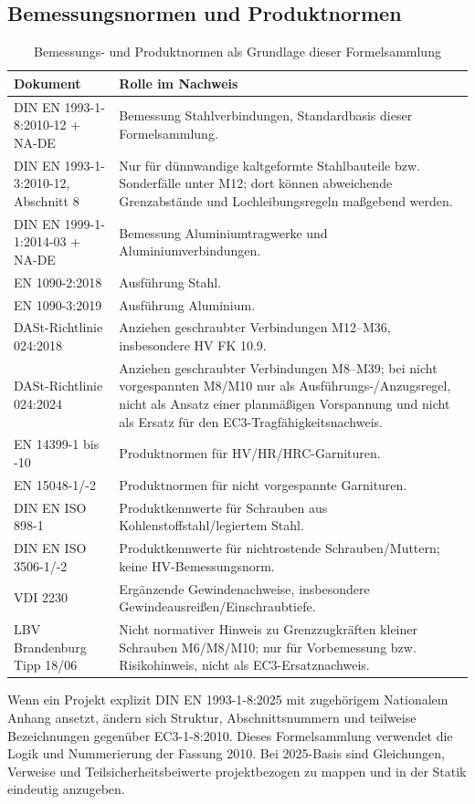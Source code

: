 \documentclass[10pt,a4paper]{article}
\newcommand{\ECthree}{DIN EN 1993-1-8:2010-12 + NA-DE}
\newcommand{\ECnine}{DIN EN 1999-1-1:2014-03 + NA-DE}
\begin{document}
\subsection{Bemessungsnormen und Produktnormen}
\begin{table}[H]
\centering
\caption{Bemessungs- und Produktnormen als Grundlage dieser Formelsammlung}
\begin{tabularx}{\textwidth}{@{}p{42mm}Y@{}}
\toprule
\textbf{Dokument} & \textbf{Rolle im Nachweis} \\
\midrule
\ECthree & Bemessung Stahlverbindungen, Standardbasis dieser Formelsammlung. \\
DIN EN 1993-1-3:2010-12, Abschnitt 8 & Nur für dünnwandige kaltgeformte Stahlbauteile bzw. Sonderfälle unter M12; dort können abweichende Grenzabstände und Lochleibungsregeln maßgebend werden. \\
\ECnine & Bemessung Aluminiumtragwerke und Aluminiumverbindungen. \\
EN 1090-2:2018 & Ausführung Stahl. \\
EN 1090-3:2019 & Ausführung Aluminium. \\
DASt-Richtlinie 024:2018 & Anziehen geschraubter Verbindungen M12--M36, insbesondere HV FK 10.9. \\
DASt-Richtlinie 024:2024 & Anziehen geschraubter Verbindungen M8--M39; bei nicht vorgespannten M8/M10 nur als Ausführungs-/Anzugsregel, nicht als Ansatz einer planmäßigen Vorspannung und nicht als Ersatz für den EC3-Tragfähigkeitsnachweis. \\
EN 14399-1 bis -10 & Produktnormen für HV/HR/HRC-Garnituren. \\
EN 15048-1/-2 & Produktnormen für nicht vorgespannte Garnituren. \\
DIN EN ISO 898-1 & Produktkennwerte für Schrauben aus Kohlenstoffstahl/legiertem Stahl. \\
DIN EN ISO 3506-1/-2 & Produktkennwerte für nichtrostende Schrauben/Muttern; keine HV-Bemessungsnorm. \\
VDI 2230 & Ergänzende Gewindenachweise, insbesondere Gewindeausreißen/Einschraubtiefe. \\
LBV Brandenburg Tipp 18/06 & Nicht normativer Hinweis zu Grenzzugkräften kleiner Schrauben M6/M8/M10; nur für Vorbemessung bzw. Risikohinweis, nicht als EC3-Ersatznachweis. \\
\bottomrule
\end{tabularx}
\end{table}

\begin{warnbox}
Wenn ein Projekt explizit DIN EN 1993-1-8:2025 mit zugehörigem Nationalem Anhang ansetzt, ändern sich Struktur, Abschnittsnummern und teilweise Bezeichnungen gegenüber EC3-1-8:2010. Dieses Formelsammlung verwendet die Logik und Nummerierung der Fassung 2010. Bei 2025-Basis sind Gleichungen, Verweise und Teilsicherheitsbeiwerte projektbezogen zu mappen und in der Statik eindeutig anzugeben.
\end{warnbox}
\end{document}
